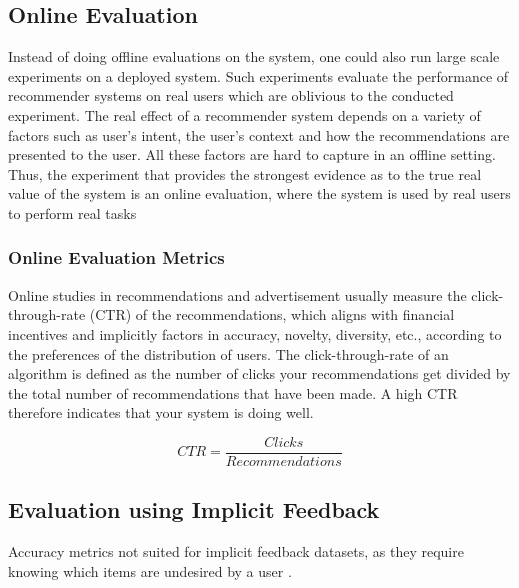 
\subsection{Online Evaluation}

Instead of doing offline evaluations on the system, one could also run large
scale experiments on a deployed system. Such experiments evaluate the
performance of recommender systems on real users which are oblivious to the
conducted experiment. The real effect of a recommender system depends on a
variety of factors such as user’s intent, the user’s context and how the
recommendations are presented to the user. All these factors are hard to
capture in an offline setting. Thus, the experiment that provides the strongest evidence as to the true real value of the system is an online evaluation, where the system is used by real users to perform real tasks

\subsubsection{Online Evaluation Metrics}

Online studies in recommendations and advertisement usually measure the click-through-rate (CTR) of the recommendations,
which aligns with financial incentives and implicitly factors in accuracy,
novelty, diversity, etc., according to the preferences of the distribution of users.
The click-through-rate of an algorithm is defined as the number of clicks your
recommendations get divided by the total number of recommendations that
have been made. A high CTR therefore indicates that your system is doing
well.

\begin{equation}
CTR = \frac{Clicks}{Recommendations}
\end{equation}

\subsection{Evaluation using Implicit Feedback}

Accuracy metrics not suited for implicit feedback datasets, as they require
knowing which items are undesired by a user \cite{Hu2008}.

